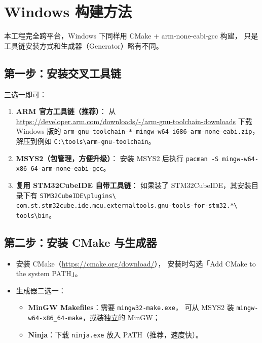 \section{Windows 构建方法}

本工程完全跨平台，Windows 下同样用 CMake + arm-none-eabi-gcc 构建，
只是工具链安装方式和生成器（Generator）略有不同。

\subsection{第一步：安装交叉工具链}

三选一即可：

\begin{enumerate}
  \item \textbf{ARM 官方工具链（推荐）}：
        从 \url{https://developer.arm.com/downloads/-/arm-gnu-toolchain-downloads}
        下载 Windows 版的 \texttt{arm-gnu-toolchain-*-mingw-w64-i686-arm-none-eabi.zip}，
        解压到例如 \texttt{C:\textbackslash tools\textbackslash arm-gnu-toolchain}。
  \item \textbf{MSYS2（包管理，方便升级）}：
        安装 MSYS2 后执行
        \texttt{pacman -S mingw-w64-x86\_64-arm-none-eabi-gcc}。
  \item \textbf{复用 STM32CubeIDE 自带工具链}：
        如果装了 STM32CubeIDE，其安装目录下有
        \texttt{STM32CubeIDE\textbackslash plugins\textbackslash
        com.st.stm32cube.ide.mcu.externaltools.gnu-tools-for-stm32.*\textbackslash
        tools\textbackslash bin}。
\end{enumerate}

\subsection{第二步：安装 CMake 与生成器}

\begin{itemize}
  \item 安装 CMake（\url{https://cmake.org/download/}），
        安装时勾选「Add CMake to the system PATH」。
  \item 生成器二选一：
    \begin{itemize}
      \item \textbf{MinGW Makefiles}：需要 \texttt{mingw32-make.exe}，
            可从 MSYS2 装 \texttt{mingw-w64-x86\_64-make}，或装独立的 MinGW；
      \item \textbf{Ninja}：下载 \texttt{ninja.exe} 放入 PATH（推荐，速度快）。
    \end{itemize}
\end{itemize}


